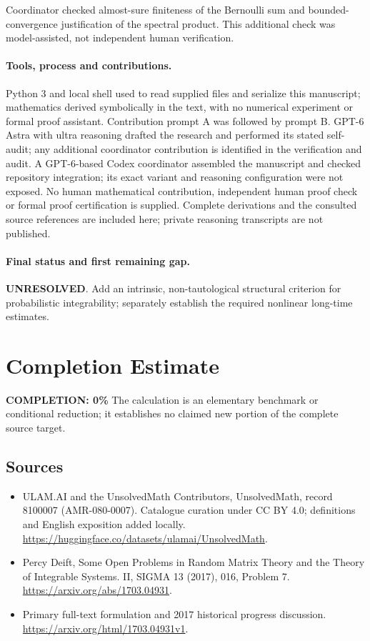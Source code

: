 \documentclass[11pt]{article}
\begin{document}
Coordinator checked almost-sure finiteness of the Bernoulli sum and bounded-convergence justification of the spectral product. This additional check was model-assisted, not independent human verification.

\paragraph{Tools, process and contributions.}
Python 3 and local shell used to read supplied files and serialize this manuscript; mathematics derived symbolically in the text, with no numerical experiment or formal proof assistant. Contribution prompt A was followed by prompt B. GPT-6 Astra with ultra reasoning drafted the research and performed its stated self-audit; any additional coordinator contribution is identified in the verification and audit. A GPT-6-based Codex coordinator assembled the manuscript and checked repository integration; its exact variant and reasoning configuration were not exposed. No human mathematical contribution, independent human proof check or formal proof certification is supplied. Complete derivations and the consulted source references are included here; private reasoning transcripts are not published.

\paragraph{Final status and first remaining gap.}
\textbf{UNRESOLVED}. Add an intrinsic, non-tautological structural criterion for probabilistic integrability; separately establish the required nonlinear long-time estimates.

\section{Completion Estimate}
\noindent\textbf{COMPLETION: 0\%}
The calculation is an elementary benchmark or conditional reduction; it establishes no claimed new portion of the complete source target.

\subsection{Sources}
\begin{itemize}
\item[\hypertarget{source:8100007:1}{S1}] ULAM.AI and the UnsolvedMath Contributors, UnsolvedMath, record 8100007 (AMR-080-0007). Catalogue curation under CC BY 4.0; definitions and English exposition added locally.
\url{https://huggingface.co/datasets/ulamai/UnsolvedMath}.
\item[\hypertarget{source:8100007:2}{S2}] Percy Deift, Some Open Problems in Random Matrix Theory and the Theory of Integrable Systems. II, SIGMA 13 (2017), 016, Problem 7.
\url{https://arxiv.org/abs/1703.04931}.
\item[\hypertarget{source:8100007:3}{S3}] Primary full-text formulation and 2017 historical progress discussion.
\url{https://arxiv.org/html/1703.04931v1}.
\end{itemize}
\label{end:8100007}
\end{document}
